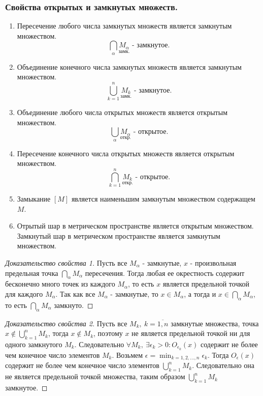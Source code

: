 \documentclass[14pt,a4paper]{extarticle}
\theoremstyle{definition}
\theoremstyle{remark}
\renewcommand{\[}{\begin{dmath*}[compact]}
\renewcommand{\]}{\end{dmath*}}
\newcommand{\be}{\begin{enumerate}}
\newcommand{\ee}{\end{enumerate}}
\newcommand{\sep}{ , \ \allowbreak }
\begin{document}
\subsubsection{Свойства открытых и замкнутых множеств.}

\be
  \item Пересечение любого числа замкнутых множеств является
  замкнутым множеством.
  \[ \bigcap _\alpha \underset {\text{замк.}} {M_\alpha}\text{ - замкнутое.} \]

  \item Объединение конечного числа замкнутых множеств является
  замкнутым множеством.
  \[ \bigcup _{k = 1}^n \underset {\text{замк.}} {M_k}\text{ - замкнутое.} \]

  \item Объединение любого числа открытых множеств является
  открытым множеством.
  \[ \bigcup _{\alpha} \underset {\text{откр.}} {M_\alpha}\text{ - открытое.} \]

  \item Пересечение конечного числа открытых множеств является
  открытым множеством.
  \[ \bigcap _{k = 1}^n \underset {\text{откр.}} {M_k}\text{ - открытое.} \]

  \item Замыкание $[M]$ является наименьшим замкнутым множеством содержащем $M$.

  \item Отрытый шар в метрическом пространстве является открытым множеством.
  Замкнутый шар в метрическом пространстве является замкнутым множеством.
\ee

\begin{proof}[Доказательство свойства 1]
  Пусть все $M_\alpha$ - замкнутые, $x$ - произвольная
  предельная точка $\bigcap _\alpha M_\alpha$ пересечения.
  Тогда любая ее окрестность содержит бесконечно много точек из каждого
  $M_\alpha$, то есть $x$ является предельной точкой для каждого $M_\alpha$.
  Так как все $M_\alpha$ - замкнутые, то $x\in M_\alpha$, а тогда и
  $x \in \bigcap _\alpha M_\alpha$, то есть $\bigcap _\alpha M_\alpha$ замкнуто.
\end{proof}

\begin{proof}[Доказательство свойства 2]
  Пусть все $M_k \sep k=\overline{1,n}$ замкнутые множества,
  точка $x \notin \bigcup _{k = 1}^n M_k$, тогда $x \notin M_k$,
  поэтому $x$ не является предельной точкой ни для одного замкнутого $M_k$.
  Следовательно $\forall M_k \sep \exists \epsilon_k > 0: O_{\epsilon_k}(x)$
  содержит не более чем конечное число элементов $M_k$.
  Возьмем $\epsilon = \min_{k=1,2,\dots,n} \epsilon_k$.
  Тогда $O_\epsilon(x)$ содержит не более чем конечное число элементов
  $\bigcup _{k = 1}^n M_k$.
  Следовательно она не является предельной точкой множества,
  таким образом $\bigcup _{k = 1}^n M_k$ замкнутое.
\end{proof}
\end{document}
